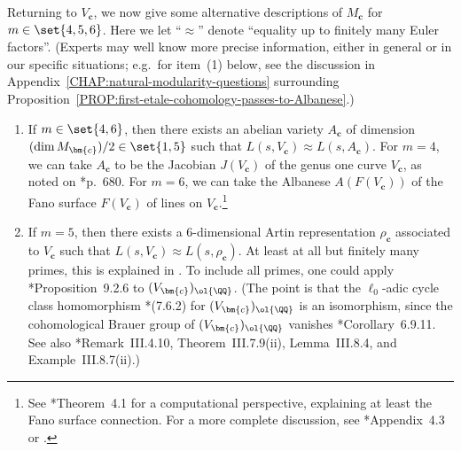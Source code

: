 \documentclass[12pt]{report}
\begin{document}

Returning to $V_{\bm{c}}$,
we now give some alternative descriptions of $M_{\bm{c}}$ for $m\in\set{4,5,6}$.
Here we let ``$\approx$'' denote ``equality up to finitely many Euler factors''.
(Experts may well know more precise information,
either in general or in our specific situations;
e.g.~for item~(1) below, see the discussion in Appendix~\ref{CHAP:natural-modularity-questions} surrounding Proposition~\ref{PROP:first-etale-cohomology-passes-to-Albanese}.)
\begin{enumerate}[(1)]
    \item If $m\in\set{4,6}$,
    then there exists an abelian variety $A_{\bm{c}}$ of dimension $(\dim M_{\bm{c}})/2\in\set{1,5}$
    such that $L(s,V_{\bm{c}})\approx L(s,A_{\bm{c}})$.
    For $m=4$,
    we can take $A_{\bm{c}}$ to be the Jacobian $J(V_{\bm{c}})$ of the genus one curve $V_{\bm{c}}$,
    as noted on \cite{heath1998circle}*{p.~680}.
    For $m=6$,
    we can take the Albanese $A(F(V_{\bm{c}}))$ of the Fano surface $F(V_{\bm{c}})$ of lines on $V_{\bm{c}}$.\footnote{See \cite{debarre2021lines}*{Theorem~4.1} for a computational perspective,
    explaining at least the Fano surface connection.
    For a more complete discussion,
    see \cite{reid1972complete}*{Appendix~4.3} or \cite{murre1974some}.}
    
    \item If $m=5$,
    then there exists a $6$-dimensional Artin representation $\rho_{\bm{c}}$ associated to $V_{\bm{c}}$ such that $L(s,V_{\bm{c}})\approx L(s,\rho_{\bm{c}})$.
    At least at all but finitely many primes,
    this is explained in \cite{manin1986cubic}.
    To include all primes, one could apply \cite{poonen2017rational}*{Proposition~9.2.6} to $(V_{\bm{c}})_{\ol{\QQ}}$.
    (The point is that the $\ell_0$-adic cycle class homomorphism \cite{poonen2017rational}*{(7.6.2)} for $(V_{\bm{c}})_{\ol{\QQ}}$ is an isomorphism, since the cohomological Brauer group of $(V_{\bm{c}})_{\ol{\QQ}}$ vanishes \cite{poonen2017rational}*{Corollary~6.9.11}.
    See also \cite{jahnel2014brauer}*{Remark~III.4.10, Theorem~III.7.9(ii), Lemma~III.8.4, and Example~III.8.7(ii)}.)
\end{enumerate}
\end{document}
